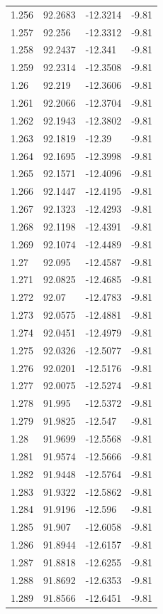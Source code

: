\begin{tabular}{llll}
1.256 & 92.2683 & -12.3214 & -9.81 \\
1.257 & 92.256 & -12.3312 & -9.81 \\
1.258 & 92.2437 & -12.341 & -9.81 \\
1.259 & 92.2314 & -12.3508 & -9.81 \\
1.26 & 92.219 & -12.3606 & -9.81 \\
1.261 & 92.2066 & -12.3704 & -9.81 \\
1.262 & 92.1943 & -12.3802 & -9.81 \\
1.263 & 92.1819 & -12.39 & -9.81 \\
1.264 & 92.1695 & -12.3998 & -9.81 \\
1.265 & 92.1571 & -12.4096 & -9.81 \\
1.266 & 92.1447 & -12.4195 & -9.81 \\
1.267 & 92.1323 & -12.4293 & -9.81 \\
1.268 & 92.1198 & -12.4391 & -9.81 \\
1.269 & 92.1074 & -12.4489 & -9.81 \\
1.27 & 92.095 & -12.4587 & -9.81 \\
1.271 & 92.0825 & -12.4685 & -9.81 \\
1.272 & 92.07 & -12.4783 & -9.81 \\
1.273 & 92.0575 & -12.4881 & -9.81 \\
1.274 & 92.0451 & -12.4979 & -9.81 \\
1.275 & 92.0326 & -12.5077 & -9.81 \\
1.276 & 92.0201 & -12.5176 & -9.81 \\
1.277 & 92.0075 & -12.5274 & -9.81 \\
1.278 & 91.995 & -12.5372 & -9.81 \\
1.279 & 91.9825 & -12.547 & -9.81 \\
1.28 & 91.9699 & -12.5568 & -9.81 \\
1.281 & 91.9574 & -12.5666 & -9.81 \\
1.282 & 91.9448 & -12.5764 & -9.81 \\
1.283 & 91.9322 & -12.5862 & -9.81 \\
1.284 & 91.9196 & -12.596 & -9.81 \\
1.285 & 91.907 & -12.6058 & -9.81 \\
1.286 & 91.8944 & -12.6157 & -9.81 \\
1.287 & 91.8818 & -12.6255 & -9.81 \\
1.288 & 91.8692 & -12.6353 & -9.81 \\
1.289 & 91.8566 & -12.6451 & -9.81 \\

\end{tabular}
